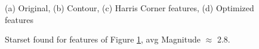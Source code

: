 \documentclass[paper=a4, fontsize=11pt]{scrartcl} %
\begin{document}
\begin{figure}[!h]
\caption{(a) Original, (b) Contour, (c) Harris Corner features, (d) Optimized features}
\label{tri}
\end{figure}

\begin{figure}[!h]
\caption{Starset found for features of Figure \ref{tri}, avg Magnitude $\approx$ 2.8. }
\label{tristar}
\end{figure}
\end{document}
